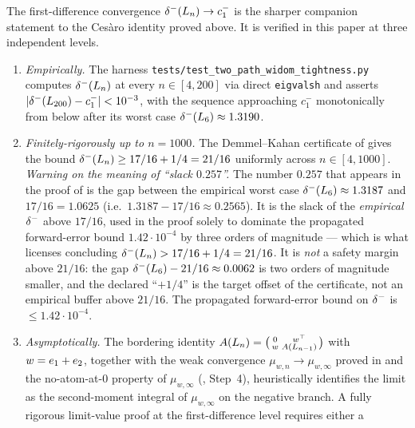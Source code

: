 \begin{remark}
\label{rem:2path-first-difference}
The first-difference convergence $\delta^{-}(L_{n}) \to c_{1}^{-}$ is the
sharper companion statement to the Ces\`aro identity proved above. It
is verified in this paper at three independent levels.
\begin{enumerate}[label=(\roman*)]
\item \emph{Empirically.} The harness
\texttt{tests/test\_two\_path\_widom\_tightness.py} computes
$\delta^{-}(L_{n})$ at every $n \in [4, 200]$ via direct \texttt{eigvalsh}
and asserts $|\delta^{-}(L_{200}) - c_{1}^{-}| < 10^{-3}$, with the
sequence approaching $c_{1}^{-}$ monotonically from below after its
worst case $\delta^{-}(L_{6}) \approx 1.3190$.
\item \emph{Finitely-rigorously up to $n = 1000$.} The
Demmel--Kahan certificate of  gives the bound
$\delta^{-}(L_{n}) \ge 17/16 + 1/4 = 21/16$ uniformly across
$n \in [4, 1000]$. \emph{Warning on the meaning of ``slack $0.257$''.}
The number $0.257$ that appears in the proof of 
is the gap between the empirical worst case
$\delta^{-}(L_{6}) \approx 1.3187$ and $17/16 = 1.0625$
(i.e.\ $1.3187 - 17/16 \approx 0.2565$). It is the
slack of the \emph{empirical} $\delta^{-}$ above $17/16$, used in the
proof solely to dominate the propagated forward-error bound
$1.42 \cdot 10^{-4}$ by three orders of magnitude --- which is what
licenses concluding $\delta^{-}(L_{n}) > 17/16 + 1/4 = 21/16$.
It is \emph{not} a safety margin above $21/16$: the gap
$\delta^{-}(L_{6}) - 21/16 \approx 0.0062$ is two orders of magnitude
smaller, and the declared ``$+1/4$'' is the target offset of the
certificate, not an empirical buffer above $21/16$. The propagated
forward-error bound on $\delta^{-}$ is $\le 1.42 \cdot 10^{-4}$.
\item \emph{Asymptotically.} The bordering identity
$A(L_{n}) = \bigl(\begin{smallmatrix} 0 & w^{\top} \\ w &
A(L_{n-1}) \end{smallmatrix}\bigr)$ with $w = e_{1} + e_{2}$,
together with the weak convergence
$\mu_{w, n} \to \mu_{w, \infty}$ proved in
 and the no-atom-at-$0$ property of
$\mu_{w, \infty}$ (, Step~4), heuristically
identifies the limit as the second-moment integral of
$\mu_{w, \infty}$ on the negative branch. A fully rigorous limit-value
proof at the first-difference level requires either a

\end{enumerate}
\end{remark}
